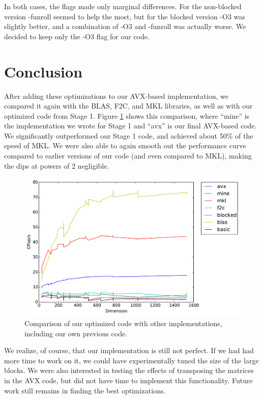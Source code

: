 \documentclass[letterpaper]{article}	 %
\begin{document}
In both cases, the flags made only marginal differences. For the non-blocked version -funroll seemed to help the most, but for the blocked version -O3 was slightly better, and a combination of -O3 and -funroll was actually worse. We decided to keep only the -O3 flag for our code.

\section{Conclusion}

After adding these optimizations to our AVX-based implementation, we compared it again with the BLAS, F2C, and MKL libraries, as well as with our optimized code from Stage 1. Figure \ref{fig:final-stage2} shows this comparison, where ``mine'' is the implementation we wrote for Stage 1 and ``avx'' is our final AVX-based code. We significantly outperformed our Stage 1 code, and achieved about 50\% of the speed of MKL. We were also able to again smooth out the performance curve compared to earlier versions of our code (and even compared to MKL), making the dips at powers of 2 negligible. 

\begin{figure}[H]
	\centering
	\includegraphics[width=.6\linewidth]{timing-stage2final.pdf}
	\caption{Comparison of our optimized code with other implementations, including our own previous code.}
	\label{fig:final-stage2}
\end{figure}

We realize, of course, that our implementation is still not perfect. If we had had more time to work on it, we could have experimentally tuned the size of the large blocks. We were also interested in testing the effects of transposing the matrices in the AVX code, but did not have time to implement this functionality. Future work still remains in finding the best optimizations.
\end{document}
